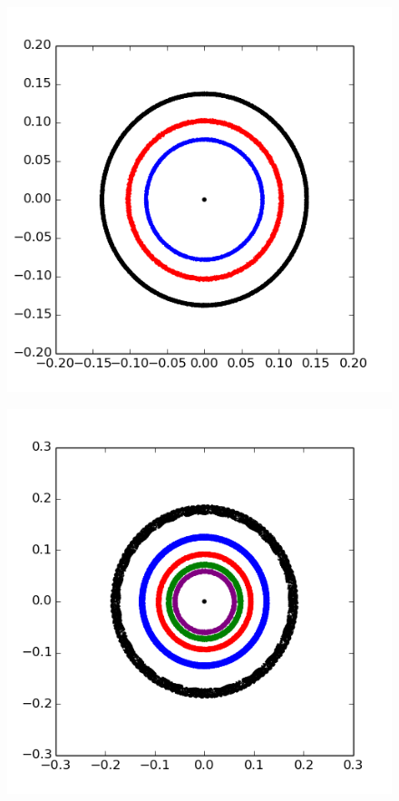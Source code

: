 \documentclass[12pt]{report}
\begin{document}
\begin{figure}
\centering
\begin{minipage}{.5\textwidth}
  \centering
  \includegraphics[width=1\linewidth]{img/180.png}
  \label{fig:stab1}
\end{minipage}%
\begin{minipage}{.5\textwidth}
  \centering
  \includegraphics[width=1\linewidth]{img/320.png}
  \label{fig:stab2}
\end{minipage}
\end{figure}
\end{document}
